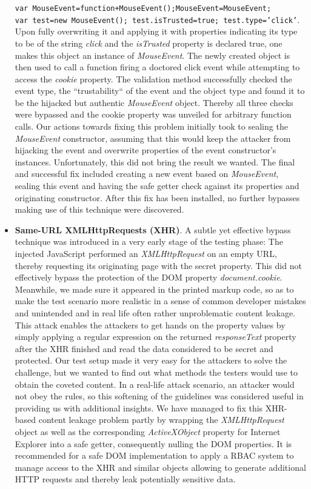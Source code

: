 \begin{itemize}
 \texttt{var MouseEvent=function+MouseEvent(){};MouseEvent=MouseEvent; \\
var test=new MouseEvent(); test.isTrusted=true; test.type='click'}.\\
 Upon fully overwriting it and applying it with properties indicating its type to be of the string \textit{click} and the \textit{isTrusted} property is declared true, one makes this object an instance of \textit{MouseEvent}. The newly created object is then used to call a function firing a doctored click event while attempting to access the \textit{cookie} property. The validation method successfully checked the event type, the ``trustability`` of the event and the object type and found it to be the hijacked but authentic \textit{MouseEvent} object. Thereby all three checks were bypassed and the cookie property was unveiled for arbitrary function calls. Our actions towards fixing this problem initially took to sealing the \textit{MouseEvent} constructor, assuming that this would keep the attacker from hijacking the event and overwrite properties of the event constructor's instances. Unfortunately, this did not bring the result we wanted. The final and successful fix included creating a new event based on \textit{MouseEvent}, sealing this event and having the safe getter check against its properties and originating constructor. After this fix has been installed, no further bypasses making use of this technique were discovered.
	\item \textbf{Same-URL XMLHttpRequests (XHR)}. A subtle yet effective bypass technique was introduced in a very early stage of the testing phase: The injected JavaScript performed an \textit{XMLHttpRequest} on an empty URL, thereby requesting its originating page with the secret property. This did not effectively bypass the protection of the DOM property \textit{document.cookie}. Meanwhile, we made sure it appeared in the printed markup code, so as to make the test scenario more realistic in a sense of common developer mistakes and unintended and in real life often rather unproblematic content leakage. This attack enables the attackers to get hands on the property values by simply applying a regular expression on the returned \textit{responseText} property after the XHR finished and read the data considered to be secret and protected. Our test setup made it very easy for the attackers to solve the challenge, but we wanted to find out what methods the testers would use to obtain the coveted content. In a real-life attack scenario, an attacker would not obey the rules, so this softening of the guidelines was considered useful in providing us with additional insights. We have managed to fix this XHR-based content leakage problem partly by wrapping the \textit{XMLHttpRequest} object as well as the corresponding \textit{ActiveXObject} property for Internet Explorer into a safe getter, consequently nulling the DOM properties. It is recommended for a safe DOM implementation to apply a RBAC system to manage access to the XHR and similar objects allowing to generate additional HTTP requests and thereby leak potentially sensitive data. 
      \end{itemize}

